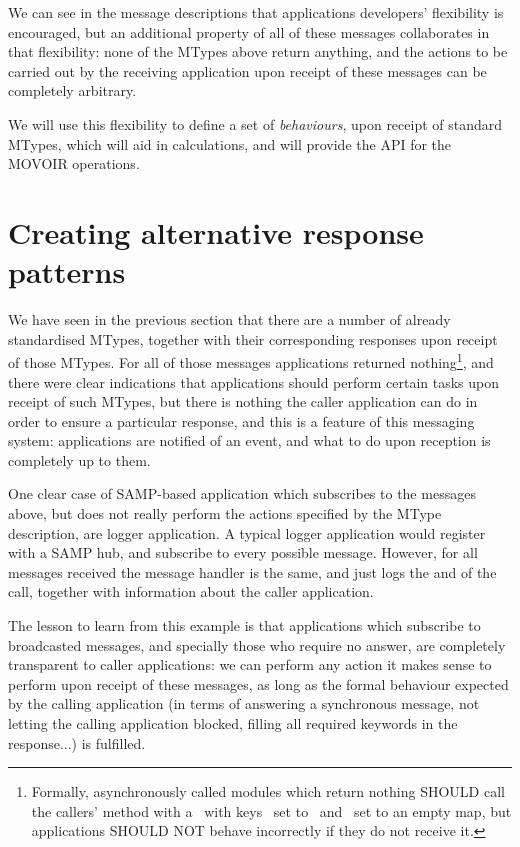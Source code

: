 				
		We can see in the message descriptions that applications
		developers' flexibility is encouraged, but an additional
		property of all of these messages collaborates in that
		flexibility: none of the MTypes above return anything, and
		the actions to be carried out by the receiving  application
		upon receipt of these messages can be completely arbitrary.
		
		We will use this flexibility to define a set of
		\emph{behaviours}, upon receipt of standard MTypes, which
		will aid in calculations, and will provide the API for
		the MOVOIR operations.
		
	
	\section{Creating alternative response patterns}
	\label{sec:movoir_alternative_behaviours}
		
		We have seen in the previous section that there are a 
		number of already standardised MTypes, together with their
		corresponding responses upon receipt of those MTypes.
		For all of those messages applications returned
		nothing\footnote{Formally, asynchronously called modules
		which return nothing SHOULD call the callers' 
		method with a \maptype\ with keys \sampstatus\ set to
		\sampok\, and \sampresult\ set to an empty map, but
		applications
		SHOULD NOT behave incorrectly if they do not receive it.},
		and there were clear indications that applications should
		perform certain tasks upon receipt of such MTypes, but
		there is nothing the caller application can do in order to
		ensure a particular response, and this is a feature of this
		messaging system: applications are notified of an event,
		and what to do upon reception is completely up to them.
		
		One clear case of SAMP-based application which subscribes
		to the messages above, but does not really perform the
		actions specified by the MType description, are logger
		application. A typical logger application would register
		with a SAMP hub, and subscribe to every possible message.
		However, for all messages received the message handler
		is the same, and just logs the \sampmtype{} and \sampparams{}
		of the call, together with information about the caller
		application.
		
		The lesson to learn from this example is that applications
		which subscribe to broadcasted messages, and specially
		those who require no answer, are completely transparent to
		caller applications: we can perform any action it makes
		sense to perform upon receipt of these messages, as long
		as the formal behaviour expected by the calling application
		(in terms of answering a synchronous message, not letting
		the calling application blocked, filling all required
		keywords in the response...) is fulfilled.
		
